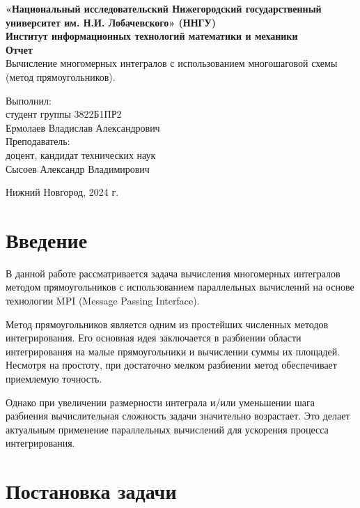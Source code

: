 \documentclass[12pt]{article}
\begin{document}
\thispagestyle{empty}
\begin{center}
    {\bfseries
    {\large «Национальный исследовательский Нижегородский государственный университет им.
Н.И. Лобачевского» (ННГУ) }\\[2em]
    {\large Институт информационных технологий математики и механики }\\[1em]
    }
    \vspace*{\fill} 
    {\LARGE\bfseries Отчет}\\[1em]
    {\large Вычисление многомерных интегралов с использованием многошаговой схемы 
(метод прямоугольников).}\\[5em]
    \vspace{\fill} 
     \hfill\parbox{0.4\textwidth}{
        Выполнил:\\
        студент группы 3822Б1ПР2\\
        Ермолаев Владислав Александрович\\[2em]
        Преподаватель:\\
        доцент, кандидат технических наук\\
        Сысоев Александр Владимирович\\[2em]
    }
    
    Нижний Новгород, 2024 г.
\end{center}
\newpage

\tableofcontents
\newpage

\section{Введение}
В данной работе рассматривается задача вычисления многомерных интегралов методом прямоугольников с использованием параллельных вычислений на основе технологии MPI (Message Passing Interface).

Метод прямоугольников является одним из простейших численных методов интегрирования. Его основная идея заключается в разбиении области интегрирования на малые прямоугольники и вычислении суммы их площадей. Несмотря на простоту, при достаточно мелком разбиении метод обеспечивает приемлемую точность.

Однако при увеличении размерности интеграла и/или уменьшении шага разбиения вычислительная сложность задачи значительно возрастает. Это делает актуальным применение параллельных вычислений для ускорения процесса интегрирования.

\newpage
\section{Постановка задачи}
\end{document}
